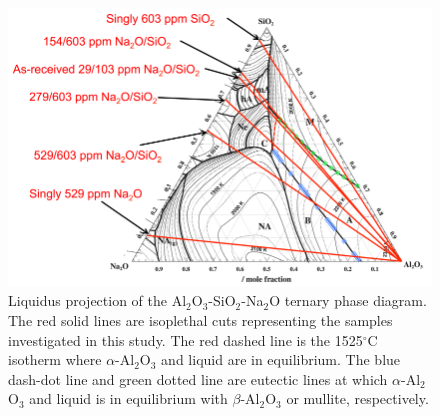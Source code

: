 \newpage
\begin{figure}[H]
	\centering
	\includegraphics[width=\textwidth]{Chapter-2/Figures/Figure9.png}
	\caption{Liquidus projection of the Al$_{2}$O$_{3}$-SiO$_{2}$-Na$_{2}$O ternary phase diagram. The red solid lines are isoplethal cuts representing the samples investigated in this study. The red dashed line is the 1525$^{\circ}$C isotherm where $\alpha$-Al$_{2}$O$_{3}$ and liquid are in equilibrium. The blue dash-dot line and green dotted line are eutectic lines at which $\alpha$-Al$_{2}$O$_{3}$ and liquid is in equilibrium with $\beta$-Al$_{2}$O$_{3}$ or mullite, respectively.}
	\label{Ch2-figure:Figure9}
\end{figure}
